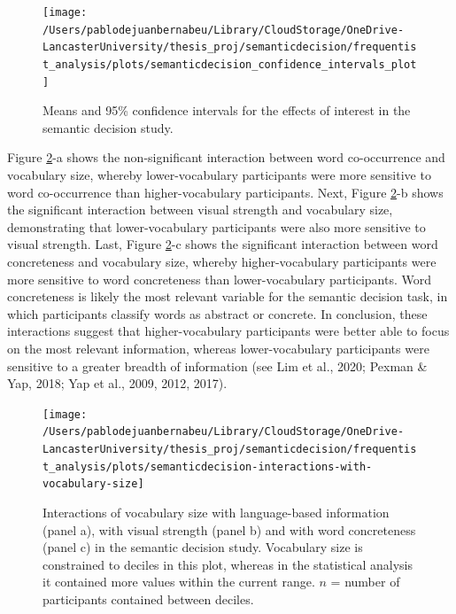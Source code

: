 \documentclass[
  12pt,
  man,floatsintext]{apa7}
\begin{document}
\FloatBarrier

\begin{figure}

{\centering \texttt{[image: /Users/pablodejuanbernabeu/Library/CloudStorage/OneDrive-LancasterUniversity/thesis\_proj/semanticdecision/frequentist\_analysis/plots/semanticdecision\_confidence\_intervals\_plot]} 

}

\caption{Means and 95\% confidence intervals for the effects of interest in the semantic decision study.}\label{fig:semanticdecision-confidence-intervals-plot}
\end{figure}

Figure \ref{fig:semanticdecision-interactions-with-vocabulary-size}-a shows the non-significant interaction between word co-occurrence and vocabulary size, whereby lower-vocabulary participants were more sensitive to word co-occurrence than higher-vocabulary participants. Next, Figure \ref{fig:semanticdecision-interactions-with-vocabulary-size}-b shows the significant interaction between visual strength and vocabulary size, demonstrating that lower-vocabulary participants were also more sensitive to visual strength. Last, Figure \ref{fig:semanticdecision-interactions-with-vocabulary-size}-c shows the significant interaction between word concreteness and vocabulary size, whereby higher-vocabulary participants were more sensitive to word concreteness than lower-vocabulary participants. Word concreteness is likely the most relevant variable for the semantic decision task, in which participants classify words as abstract or concrete. In conclusion, these interactions suggest that higher-vocabulary participants were better able to focus on the most relevant information, whereas lower-vocabulary participants were
sensitive to a greater breadth of information (see Lim et al., 2020; Pexman \& Yap, 2018; Yap et al., 2009, 2012, 2017).



\begin{figure}

{\centering \texttt{[image: /Users/pablodejuanbernabeu/Library/CloudStorage/OneDrive-LancasterUniversity/thesis\_proj/semanticdecision/frequentist\_analysis/plots/semanticdecision-interactions-with-vocabulary-size]} 

}

\caption{Interactions of vocabulary size with language-based information (panel a), with visual strength (panel b) and with word concreteness (panel c) in the semantic decision study. Vocabulary size is constrained to deciles in this plot, whereas in the statistical analysis it contained more values within the current range. \(n\) = number of participants contained between deciles.}\label{fig:semanticdecision-interactions-with-vocabulary-size}
\end{figure}
\end{document}
